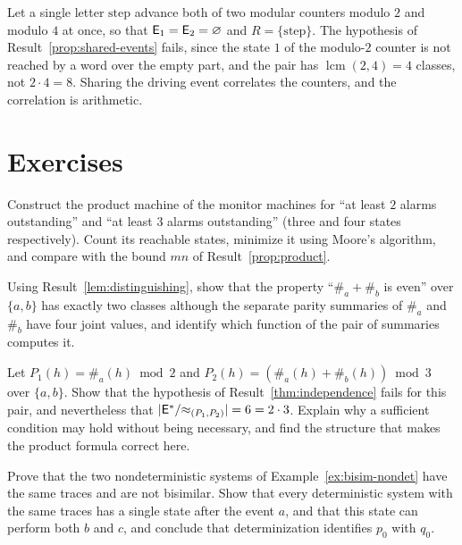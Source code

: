 \begin{example}\label{ex:reach-fail}
Let a single letter $\mathrm{step}$ advance both of two modular counters modulo $2$ and modulo $4$ at once, so that $\mathsf{E}_1=\mathsf{E}_2=\varnothing$ and $R=\{\mathrm{step}\}$. The hypothesis of Result~\ref{prop:shared-events} fails, since the state $1$ of the modulo-$2$ counter is not reached by a word over the empty part, and the pair has $\operatorname{lcm}(2,4)=4$ classes, not $2\cdot4=8$. Sharing the driving event correlates the counters, and the correlation is arithmetic.
\end{example}

\section*{Exercises}

\begin{exercise}
Construct the product machine of the monitor machines for ``at least $2$ alarms outstanding'' and ``at least $3$ alarms outstanding'' (three and four states respectively). Count its reachable states, minimize it using Moore's algorithm, and compare with the bound $mn$ of Result~\ref{prop:product}.
\end{exercise}

\begin{exercise}
Using Result~\ref{lem:distinguishing}, show that the property ``$\#_a+\#_b$ is even'' over $\{a,b\}$ has exactly two classes although the separate parity summaries of $\#_a$ and $\#_b$ have four joint values, and identify which function of the pair of summaries computes it.
\end{exercise}

\begin{exercise}
Let $P_1(h)=\#_a(h)\bmod2$ and $P_2(h)=(\#_a(h)+\#_b(h))\bmod3$ over $\{a,b\}$. Show that the hypothesis of Result~\ref{thm:independence} fails for this pair, and nevertheless that $|\mathsf{E}^{*}/{\approx_{(P_1,P_2)}}|=6=2\cdot3$. Explain why a sufficient condition may hold without being necessary, and find the structure that makes the product formula correct here.
\end{exercise}

\begin{exercise}
Prove that the two nondeterministic systems of Example~\ref{ex:bisim-nondet} have the same traces and are not bisimilar. Show that every deterministic system with the same traces has a single state after the event $a$, and that this state can perform both $b$ and $c$, and conclude that determinization identifies $p_0$ with $q_0$.
\end{exercise}

